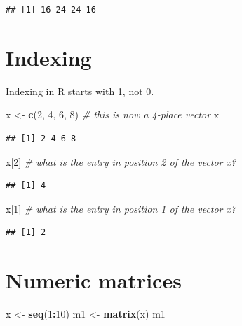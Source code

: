 \documentclass[
]{book}
\newenvironment{Shaded}{\begin{snugshade}}{\end{snugshade}}
\newcommand{\CommentTok}[1]{\textcolor[rgb]{0.56,0.35,0.01}{\textit{#1}}}
\newcommand{\DecValTok}[1]{\textcolor[rgb]{0.00,0.00,0.81}{#1}}
\newcommand{\FunctionTok}[1]{\textcolor[rgb]{0.13,0.29,0.53}{\textbf{#1}}}
\newcommand{\NormalTok}[1]{#1}
\newcommand{\OtherTok}[1]{\textcolor[rgb]{0.56,0.35,0.01}{#1}}
\newcommand{\SpecialCharTok}[1]{\textcolor[rgb]{0.81,0.36,0.00}{\textbf{#1}}}
\begin{document}
\begin{verbatim}
## [1] 16 24 24 16
\end{verbatim}

\hypertarget{indexing}{%
\section{Indexing}\label{indexing}}

Indexing in R starts with 1, not 0.

\begin{Shaded}
\begin{Highlighting}[]
\NormalTok{x }\OtherTok{\textless{}{-}} \FunctionTok{c}\NormalTok{(}\DecValTok{2}\NormalTok{, }\DecValTok{4}\NormalTok{, }\DecValTok{6}\NormalTok{, }\DecValTok{8}\NormalTok{)   }\CommentTok{\# this is now a 4{-}place vector}
\NormalTok{x}
\end{Highlighting}
\end{Shaded}

\begin{verbatim}
## [1] 2 4 6 8
\end{verbatim}

\begin{Shaded}
\begin{Highlighting}[]
\NormalTok{x[}\DecValTok{2}\NormalTok{] }\CommentTok{\# what is the entry in position 2 of the vector x?}
\end{Highlighting}
\end{Shaded}

\begin{verbatim}
## [1] 4
\end{verbatim}

\begin{Shaded}
\begin{Highlighting}[]
\NormalTok{x[}\DecValTok{1}\NormalTok{] }\CommentTok{\# what is the entry in position 1 of the vector x?}
\end{Highlighting}
\end{Shaded}

\begin{verbatim}
## [1] 2
\end{verbatim}

\hypertarget{numeric-matrices}{%
\section{Numeric matrices}\label{numeric-matrices}}

\begin{Shaded}
\begin{Highlighting}[]
\NormalTok{x }\OtherTok{\textless{}{-}} \FunctionTok{seq}\NormalTok{(}\DecValTok{1}\SpecialCharTok{:}\DecValTok{10}\NormalTok{)}
\NormalTok{m1 }\OtherTok{\textless{}{-}} \FunctionTok{matrix}\NormalTok{(x)}
\NormalTok{m1}
\end{Highlighting}
\end{Shaded}
\end{document}
